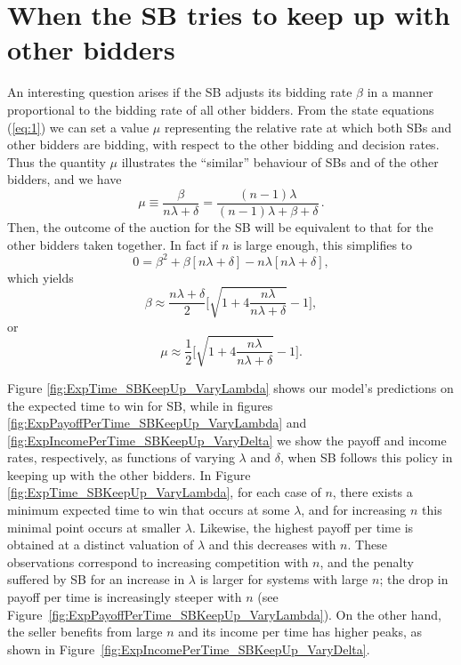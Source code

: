 \documentclass{comjnl}
\begin{document}
\section{When the SB tries to keep up with other bidders} \label{KeepUp}

An interesting question arises if the SB adjusts its bidding rate
$\beta$ in a manner proportional to the bidding rate of all other
bidders. From the state equations (\ref{eq:1}) we can set a value
$\mu$ representing the relative rate at which both SBs and other
bidders are bidding, with respect to the other bidding and
decision rates. Thus the quantity $\mu$ illustrates the
``similar'' behaviour of SBs and of the other bidders, and we have
\begin{equation}
\mu\equiv\frac{\beta}{n\lambda+\delta}=\frac{(n-1)\lambda}{(n-1)\lambda+\beta+\delta}
\,. \nonumber
\end{equation}
Then, the outcome of the auction for the SB will be equivalent to
that for the other bidders taken together. In fact if $n$ is large
enough, this simplifies to
\begin{equation}\label{eq}
0 = \beta^2+\beta[n\lambda+\delta]-n\lambda[n\lambda+\delta],
\end{equation}
which yields
\begin{equation}
\beta\approx\frac{n\lambda+\delta}{2}\bigg[\sqrt{1+4\frac{n\lambda}{n\lambda+\delta}}
-1\bigg], \label{beta}
\end{equation}
or
\begin{equation}
\mu\approx\frac{1}{2}\bigg[\sqrt{1+4\frac{n\lambda}{n\lambda+\delta}}
-1\bigg] .\label{mu}
\end{equation}


Figure \ref{fig:ExpTime_SBKeepUp_VaryLambda} shows our model's
predictions on the expected time to win for SB, while in figures
\ref{fig:ExpPayoffPerTime_SBKeepUp_VaryLambda} and
\ref{fig:ExpIncomePerTime_SBKeepUp_VaryDelta} we show the payoff
and income rates, respectively, as functions of varying $\lambda$
and $\delta$, when SB follows this policy in keeping up with the
other bidders. In Figure \ref{fig:ExpTime_SBKeepUp_VaryLambda},
for each case of $n$, there exists a minimum expected time to win
that occurs at some $\lambda$, and for increasing $n$ this minimal
point occurs at smaller $\lambda$. Likewise, the highest payoff
per time is obtained at a distinct valuation of $\lambda$ and this
decreases with $n$. These observations correspond to increasing
competition with $n$, and the penalty suffered by SB for an
increase in $\lambda$ is larger for systems with large $n$; the
drop in payoff per time is increasingly steeper with $n$ (see
Figure~\ref{fig:ExpPayoffPerTime_SBKeepUp_VaryLambda}). On the
other hand, the seller benefits from large $n$ and its income per
time has higher peaks, as shown in
Figure~\ref{fig:ExpIncomePerTime_SBKeepUp_VaryDelta}.
\end{document}
